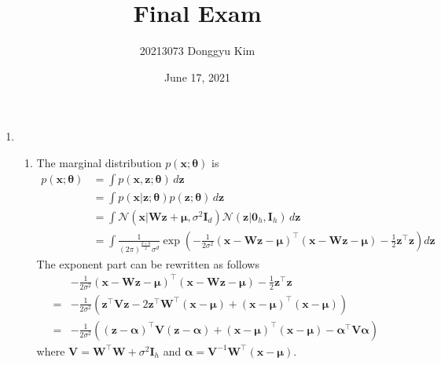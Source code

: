 \documentclass[11pt]{article}
\title{Final Exam}
\author{20213073 Donggyu Kim}
\date{June 17, 2021}
\begin{document}
\maketitle
\thispagestyle{fancy}

\begin{enumerate}
\item
\begin{enumerate}
    \item
    The marginal distribution $p(\bm x;\bm\theta)$ is
    \begin{align*}
    p(\bm x;\bm\theta) &= \int p(\bm x,\bm z;\bm\theta)\,d\bm z \\
    &= \int p(\bm x|\bm z;\bm\theta)p(\bm z;\bm\theta)\,d\bm z \\
    &= \int\mathcal{N}(\bm x|\bm W\bm z+\bm\mu,\sigma^2\bm I_{d})\mathcal{N}(\bm z|\bm 0_{h},\bm I_{h})\,d\bm z \\
    &= \int\frac{1}{(2\pi)^\frac{d+h}{2}\sigma^d}\exp\left(-\frac{1}{2\sigma^2}(\bm x-\bm W\bm z-\bm\mu)^{\top}(\bm x-\bm W\bm z-\bm\mu)-\frac{1}{2}\bm z^{\top}\bm z\right)d\bm z
    \end{align*}
    The exponent part can be rewritten as follows
    \begin{align*}
    & -\frac{1}{2\sigma^2}(\bm x-\bm W\bm z-\bm\mu)^{\top}(\bm x-\bm W\bm z-\bm\mu)-\frac{1}{2}\bm z^{\top}\bm z \\
    =& -\frac{1}{2\sigma^2}\left(\bm z^{\top}\bm V\bm z-2\bm z^{\top}\bm W^{\top}(\bm x-\bm\mu)+(\bm x-\bm\mu)^{\top}(\bm x-\bm\mu)\right) \\
    =& -\frac{1}{2\sigma^2}\left((\bm z-\bm\alpha)^{\top}\bm V(\bm z-\bm\alpha)+(\bm x-\bm\mu)^{\top}(\bm x-\bm\mu)-\bm\alpha^{\top}\bm V\bm\alpha\right)
    \end{align*}
    where $\bm V=\bm W^{\top}\bm W+\sigma^2\bm I_h$ and $\bm\alpha=\bm V^{-1}\bm W^{\top}(\bm x-\bm\mu)$.
    

\end{enumerate}
\end{enumerate}
\end{document}
